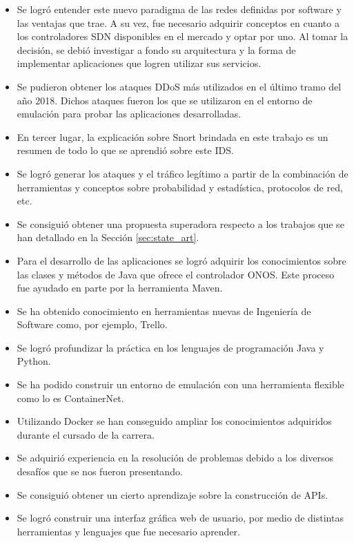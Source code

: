 \begin{itemize}
    \item {Se logró entender este nuevo paradigma de las redes definidas por software y las ventajas que trae. A su vez, fue necesario adquirir conceptos en cuanto a los controladores SDN disponibles en el mercado y optar por uno. Al tomar la decisión, se debió investigar a fondo su arquitectura y la forma de implementar aplicaciones que logren utilizar sus servicios.}
    \item {Se pudieron obtener los ataques DDoS más utilizados en el último tramo del año 2018. Dichos ataques fueron los que se utilizaron en el entorno de emulación para probar las aplicaciones desarrolladas.}
    \item {En tercer lugar, la explicación sobre Snort brindada en este trabajo es un resumen de todo lo que se aprendió sobre este IDS.}
    \item {Se logró generar los ataques y el tráfico legítimo a partir de la combinación de herramientas y conceptos sobre probabilidad y estadística, protocolos de red, etc.}
    \item {Se consiguió obtener una propuesta superadora respecto a los trabajos que se han detallado en la Sección \ref{sec:state_art}.}
    \item {Para el desarrollo de las aplicaciones se logró adquirir los conocimientos sobre las clases y métodos de Java que ofrece el controlador ONOS. Este proceso fue ayudado en parte por la herramienta Maven.}
    \item {Se ha obtenido conocimiento en herramientas nuevas de Ingeniería de Software como, por ejemplo, Trello.}
    \item {Se logró profundizar la práctica en los lenguajes de programación Java y Python.}
    \item {Se ha podido construir un entorno de emulación con una herramienta flexible como lo es ContainerNet.}
    \item {Utilizando Docker se han conseguido ampliar los conocimientos adquiridos durante el cursado de la carrera.}
    \item {Se adquirió experiencia en la resolución de problemas debido a los diversos desafíos que se nos fueron presentando.}
    \item {Se consiguió obtener un cierto aprendizaje sobre la construcción de APIs.}
    \item{Se logró construir una interfaz gráfica web de usuario, por medio de distintas herramientas y lenguajes que fue necesario aprender.}
\end{itemize}


